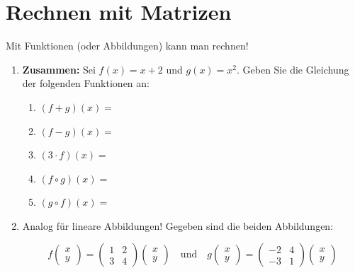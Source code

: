 \section{Rechnen mit Matrizen}
\begin{LA}
    {}{}
    Mit Funktionen (oder Abbildungen) kann man rechnen!
    \begin{enumerate}
        \item \textbf{Zusammen:} Sei \( f(x) = x+2 \) und \( g(x) = x^2 \). Geben Sie die Gleichung der folgenden Funktionen an:

        \begin{enumerate}
            \item \( (f+g)(x) = \)
            \vspace{10pt}
            \item \( (f-g)(x) = \)
            \vspace{10pt}
            \item \( (3 \cdot f)(x) = \)
            \vspace{10pt}
            \item \( (f \circ g)(x) = \)
            \vspace{10pt}
            \item \( (g \circ f)(x) = \)
            \vspace{10pt}
        \end{enumerate}
        \item Analog für lineare Abbildungen! Gegeben sind die beiden Abbildungen:

        \[
        f \begin{pmatrix} x \\ y \end{pmatrix} = 
        \begin{pmatrix} 1 & 2 \\ 3 & 4 \end{pmatrix} 
        \begin{pmatrix} x \\ y \end{pmatrix}
        \quad \text{und} \quad
        g \begin{pmatrix} x \\ y \end{pmatrix} = 
        \begin{pmatrix} -2 & 4 \\ -3 & 1 \end{pmatrix} 
        \begin{pmatrix} x \\ y \end{pmatrix}
        \]
        

\end{enumerate}
\end{LA}
